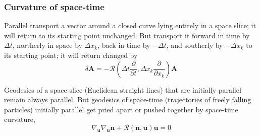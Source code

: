 \subsubsection{Curvature of space-time}
Parallel transport a vector around a closed curve lying entirely in a space slice; it will return to its starting point unchanged.
But transport it forward in time by $\Delta t$, northerly in space by $\Delta x_k$, back in time by $-\Delta t$, and southerly by $-\Delta x_k$ to its starting point; it will return changed by
\[\delta \bm{A} = -\mathcal{R}(\Delta t \frac{\partial}{\partial t},\Delta x_k \frac{\partial}{\partial x_k}) \bm{A}\]

Geodesics of a space slice (Euclidean straight lines) that are initially parallel remain always parallel. But geodesics of space-time (trajectories of freely falling particles) initially parallel get pried apart or pushed together by space-time curvature,
\[\nabla_{\bm{u}} \nabla_{\bm{u}} \bm{n} + \mathcal{R}(\bm{n},\bm{u})\bm{u} = 0\]

